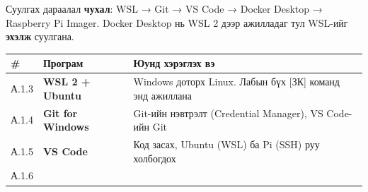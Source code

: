 Суулгах дараалал \textbf{чухал}: WSL → Git → VS Code → Docker Desktop → Raspberry Pi Imager. Docker Desktop нь WSL 2 дээр ажилладаг тул WSL-ийг \textbf{эхэлж} суулгана.

\begingroup\scriptsize\begin{longtable}[]{@{}lll@{}}
\toprule
\begin{minipage}[b]{0.30\columnwidth}\raggedright
\#\strut
\end{minipage} & \begin{minipage}[b]{0.30\columnwidth}\raggedright
Програм\strut
\end{minipage} & \begin{minipage}[b]{0.30\columnwidth}\raggedright
Юунд хэрэглэх вэ\strut
\end{minipage}\tabularnewline
\midrule
\endhead
\begin{minipage}[t]{0.30\columnwidth}\raggedright
А.1.3\strut
\end{minipage} & \begin{minipage}[t]{0.30\columnwidth}\raggedright
\textbf{WSL 2 + Ubuntu}\strut
\end{minipage} & \begin{minipage}[t]{0.30\columnwidth}\raggedright
Windows доторх Linux. Лабын бүх {[}ЗК{]} команд энд ажиллана\strut
\end{minipage}\tabularnewline
\begin{minipage}[t]{0.30\columnwidth}\raggedright
А.1.4\strut
\end{minipage} & \begin{minipage}[t]{0.30\columnwidth}\raggedright
\textbf{Git for Windows}\strut
\end{minipage} & \begin{minipage}[t]{0.30\columnwidth}\raggedright
Git-ийн нэвтрэлт (Credential Manager), VS Code-ийн Git\strut
\end{minipage}\tabularnewline
\begin{minipage}[t]{0.30\columnwidth}\raggedright
А.1.5\strut
\end{minipage} & \begin{minipage}[t]{0.30\columnwidth}\raggedright
\textbf{VS Code}\strut
\end{minipage} & \begin{minipage}[t]{0.30\columnwidth}\raggedright
Код засах, Ubuntu (WSL) ба Pi (SSH) руу холбогдох\strut
\end{minipage}\tabularnewline
\begin{minipage}[t]{0.30\columnwidth}\raggedright
А.1.6\strut
\end{minipage} & \begin{minipage}[t]{0.30\columnwidth}\raggedright

\end{minipage}
\end{longtable}
